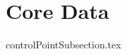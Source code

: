 \documentclass{book}
\title{}  %
\begin{document}
\ifstandalone
\maketitle %
\clearpage
\tableofcontents %
\clearpage
\fi


\section{Core Data}

{controlPointSubsection.tex}
\end{document}
